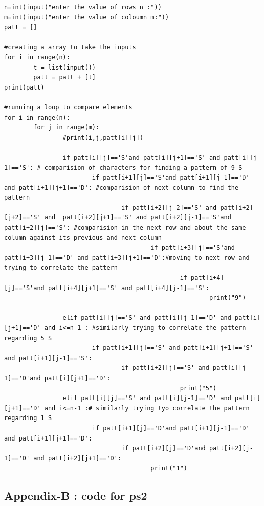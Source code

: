 \documentclass[a4paper,12pt]{article}
\begin{document}
\begin{lstlisting}[style=CStyle]
n=int(input("enter the value of rows n :"))
m=int(input("enter the value of coloumn m:"))
patt = []

#creating a array to take the inputs
for i in range(n):
        t = list(input())
        patt = patt + [t]
print(patt)

#running a loop to compare elements
for i in range(n):
        for j in range(m):
                #print(i,j,patt[i][j])

                if patt[i][j]=='S'and patt[i][j+1]=='S' and patt[i][j-1]=='S': # comparision of characters for finding a pattern of 9 S
                        if patt[i+1][j]=='S'and patt[i+1][j-1]=='D' and patt[i+1][j+1]=='D': #comparision of next column to find the pattern
                                if patt[i+2][j-2]=='S' and patt[i+2][j+2]=='S' and  patt[i+2][j+1]=='S' and patt[i+2][j-1]=='S'and patt[i+2][j]=='S': #comparision in the next row and about the same column against its previous and next column 
                                        if patt[i+3][j]=='S'and patt[i+3][j-1]=='D' and patt[i+3][j+1]=='D':#moving to next row and trying to correlate the pattern 
                                                if patt[i+4][j]=='S'and patt[i+4][j+1]=='S' and patt[i+4][j-1]=='S':   
                                                        print("9")

                elif patt[i][j]=='S' and patt[i][j-1]=='D' and patt[i][j+1]=='D' and i<=n-1 : #similarly trying to correlate the pattern regarding 5 S
                        if patt[i+1][j]=='S' and patt[i+1][j+1]=='S' and patt[i+1][j-1]=='S':
                                if patt[i+2][j]=='S' and patt[i][j-1]=='D'and patt[i][j+1]=='D':
                                                print("5")
                elif patt[i][j]=='S' and patt[i][j-1]=='D' and patt[i][j+1]=='D' and i<=n-1 :# similarly trying tyo correlate the pattern regarding 1 S
                        if patt[i+1][j]=='D'and patt[i+1][j-1]=='D' and patt[i+1][j+1]=='D':
                                if patt[i+2][j]=='D'and patt[i+2][j-1]=='D' and patt[i+2][j+1]=='D':
                                        print("1")
\end{lstlisting}

\newpage
\subsection{Appendix-B : code for ps2}
\end{document}
